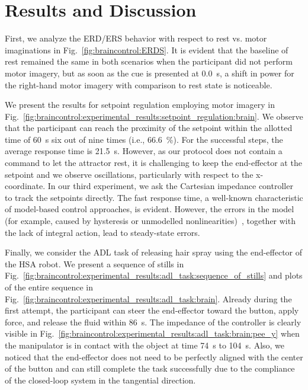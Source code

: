 \documentclass[letterpaper, 10pt, conference]{ieeeconf}      %
\begin{document}
\section{Results and Discussion}\label{sec:braincontrol:results_and_discussion}

First, we analyze the \gls{ERD}/\gls{ERS} behavior with respect to rest vs. motor imaginations in Fig.~\ref{fig:braincontrol:ERDS}. It is evident that the baseline of rest remained the same in both scenarios when the participant did not perform motor imagery, but as soon as the cue is presented at \SI{0.0}{s}, a shift in power for the right-hand motor imagery with comparison to rest state is noticeable. 

We present the results for setpoint regulation employing motor imagery in Fig.~\ref{fig:braincontrol:experimental_results:setpoint_regulation:brain}. 
We observe that the participant can reach the proximity of the setpoint within the allotted time of \SI{60}{s} six out of nine times (i.e., \SI{66.6}{\percent}).
For the successful steps, the average response time is \SI{21.5}{s}.
However, as our protocol does not contain a command to let the attractor rest, it is challenging to keep the end-effector at the setpoint and we observe oscillations, particularly with respect to the x-coordinate.
In our third experiment, we ask the Cartesian impedance controller to track the setpoints directly.
The fast response time, a well-known characteristic of model-based control approaches, is evident. However, the errors in the model (for example, caused by hysteresis or unmodelled nonlinearities)~\cite{stolzle2023experimental}, together with the lack of integral action, lead to steady-state errors. %

Finally, we consider the \gls{ADL} task of releasing hair spray using the end-effector of the \gls{HSA} robot. We present a sequence of stills in Fig.~\ref{fig:braincontrol:experimental_results:adl_task:sequence_of_stills} and plots of the entire sequence in Fig.~\ref{fig:braincontrol:experimental_results:adl_task:brain}.
Already during the first attempt, the participant can steer the end-effector toward the button, apply force, and release the fluid within \SI{86}{s}.
The impedance of the controller is clearly visible in Fig.~\ref{fig:braincontrol:experimental_results:adl_task:brain:pee_y} when the manipulator is in contact with the object at time \SI{74}{s} to \SI{104}{s}.
Also, we noticed that the end-effector does not need to be perfectly aligned with the center of the button and can still complete the task successfully due to the compliance of the closed-loop system in the tangential direction.
\end{document}
